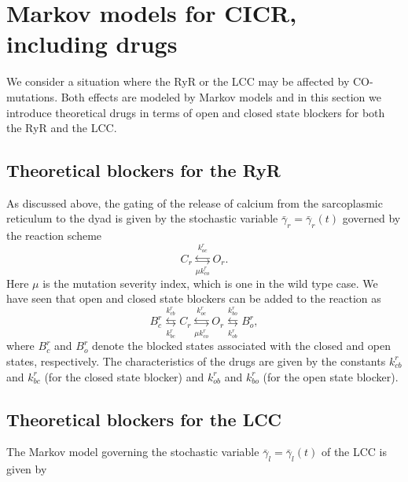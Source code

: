 \section{Markov models for CICR, including drugs}

We consider a situation where the RyR or the LCC may be affected by CO-mutations. Both effects are modeled by Markov models and in this section we introduce theoretical drugs in terms of open and closed state blockers for both the RyR and the LCC.

\subsection{Theoretical blockers for the RyR}

As discussed above, the gating of the release of calcium from the sarcoplasmic reticulum to the dyad is
given by the stochastic variable $\bar{\gamma}_{r}=\bar{\gamma}_{r}(t)$
governed by the reaction scheme%
\begin{equation}
C_{r}\underset{\mu k_{co}^{r}}{\overset{k_{oc}^{r}}{\leftrightarrows}}%
O_{r}.\label{m_r2}%
\end{equation}
Here $\mu$ is the mutation severity index, which is one in the wild type case. 
We have seen that open and closed state blockers can be added to the reaction as%
\begin{equation}
B_{c}^{r}\underset{k_{bc}^{r}}{\overset{k_{cb}^{r}}{\leftrightarrows}}%
C_{r}\underset{\mu k_{co}^{r}}{\overset{k_{oc}^{r}}{\leftrightarrows}}%
O_{r}\underset{k_{ob}^{r}}{\overset{k_{bo}^{r}}{\leftrightarrows}}B_{o}%
^{r},\label{m_r2d}%
\end{equation}
where $B_{c}^{r}$ and $B_{o}^{r}$ denote the blocked states associated with the
closed and open states, respectively. The characteristics of the drugs are
given by the constants $k_{cb}^{r}$ and $k_{bc}^{r}$ (for the closed state blocker) and
$k_{ob}^{r}$ and $k_{bo}^{r}$ (for the open state blocker).

\subsection{Theoretical blockers for the LCC}
The Markov model governing the stochastic variable $\bar{\gamma}%
_{l}=\bar{\gamma}_{l}(t)$ of the LCC is given by%

